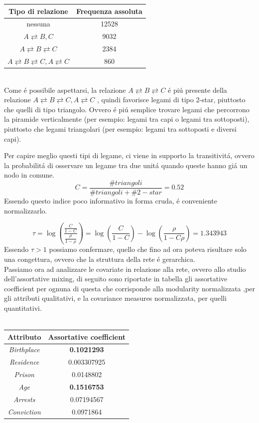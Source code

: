 \documentclass[11pt,a4paper]{report}
\begin{document}
\begin{tabular}{c|c}
Tipo di relazione	&  Frequenza assoluta \\ 
	\hline 
nessuna	& 12528 \\ 
	\hline 
$A \rightleftarrows B, C$	& 9032 \\ 
	\hline 
$A \rightleftarrows B \rightleftarrows C	$& 2384 \\ 
	\hline 
$A \rightleftarrows B \rightleftarrows C, A \rightleftarrows C	$& 860  \\ 
\end{tabular} 
\\
Come \'e possibile aspettarsi, la relazione  $A \rightleftarrows B \rightleftarrows C $ \'e pi\'u presente della relazione $A \rightleftarrows B \rightleftarrows C, A \rightleftarrows C$ , quindi favorisce legami di tipo 2-star, piuttosto che quelli di tipo triangolo. Ovvero \'e pi\'u semplice trovare legami che percorrono la piramide verticalmente (per esempio: legami tra capi o legami tra sottoposti), piuttosto che legami triangolari (per esempio: legami tra sottoposti e diversi capi).

Per capire meglio questi tipi di legame, ci viene in supporto la transitivit\'a, ovvero la probabilit\'a di osservare un legame tra due unit\'a quando queste hanno gi\'a un nodo in comune.
$$ C=\frac{\# triangoli}{\#  triangoli + \# 2-star }=0.52$$
Essendo questo indice poco informativo in forma cruda, \'e conveniente normalizzarlo.

$$ \tau= \log \left(  \frac{\frac{C}{1-C}}{\frac{\rho}{1-\rho}} \right)  = \log \left({\frac{C}{1-C}} \right) - \log \left({\frac{\rho}{1-C\rho}} \right) =1.343943 $$
Essendo $\tau >1 $ possiamo confermare, quello che fino ad ora poteva risultare solo una congettura, ovvero che la struttura della rete \'e gerarchica.
\\
Passiamo ora ad analizzare le covariate in relazione alla rete, ovvero allo studio dell'assortative mixing, di seguito sono riportate in tabella gli assortative coefficient per ognuna di questa che corrisponde alla modularity normalizzata ,per gli attributi qualitativi, e la covariance measures normalizzata, per quelli quantitativi.
\\
\\
\begin{center}
\begin{tabular}{c|c}
	\hline 
	Attributo & Assortative coefficient   \\ 
	\hline \hline 
	\emph{Birthplace}& \textbf{0.1021293 }\\ 
	\hline 
	\emph{Residence}	& 0.003307925 \\ 
	\hline 
	\emph{Prison}	& 0.0148802 \\ 
	\hline 
	\emph{Age}	& \textbf{0.1516753} \\ 
	\hline 
	\emph{Arrests}	& 0.07194567 \\ 
	\hline 
	\emph{Conviction}	& 0.0971864 \\ 
	\hline 
\end{tabular} 
\end{center}
\end{document}
